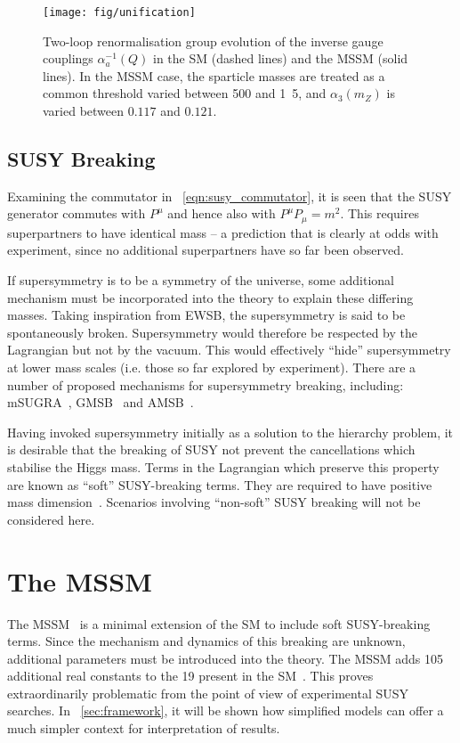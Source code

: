 \begin{figure}[h]
\centering
\texttt{[image: fig/unification]}
\caption[Two-loop renormalisation group evolution of the inverse gauge
couplings]{Two-loop renormalisation group evolution of the inverse gauge
  couplings $\alpha_a^{−1}(Q)$ in the \ac{SM} (dashed lines) and the \ac{MSSM}
  (solid lines). In the MSSM case, the sparticle masses are treated as a common
  threshold varied between \unit{500}{\GeV} and \unit{1.5}{\TeV}, and
  $\alpha_3(m_Z)$ is varied between $0.117$ and $0.121$.~\cite{susy_primer}}
\label{fig:susy_gauge_unification}
\end{figure}

\subsection{\acl{SUSY} Breaking}
Examining the commutator in \eqn~\ref{eqn:susy_commutator}, it is seen that the
\ac{SUSY} generator \Qa commutes with $P^{\mu}$ and hence also with
$P^{\mu}P_{\mu} = m^2$. This requires superpartners to have identical mass -- a
prediction that is clearly at odds with experiment, since no additional
superpartners have so far been observed.

If supersymmetry is to be a symmetry of the universe, some additional mechanism
must be incorporated into the theory to explain these differing masses. Taking
inspiration from \ac{EWSB}, the supersymmetry is said to be spontaneously
broken. Supersymmetry would therefore be respected by the Lagrangian but not by
the vacuum. This would effectively ``hide'' supersymmetry at lower mass scales
(i.e. those so far explored by experiment). There are a number of proposed
mechanisms for supersymmetry breaking, including: \ac{mSUGRA}~\cite{msugra},
\ac{GMSB}~\cite{gmsb} and \ac{AMSB}~\cite{amsb}.

Having invoked supersymmetry initially as a solution to the hierarchy problem,
it is desirable that the breaking of \ac{SUSY} not prevent the cancellations
which stabilise the Higgs mass. Terms in the Lagrangian which preserve this
property are known as ``soft'' \ac{SUSY}-breaking terms. They are required to
have positive mass dimension~\cite{susy_primer}. Scenarios involving
``non-soft'' \ac{SUSY} breaking will not be considered here.

\section{The \acl{MSSM}}
\label{sec:susy_mssm}
The \acf{MSSM}~\cite{mssm} is a minimal extension of the \ac{SM} to include soft
\ac{SUSY}-breaking terms. Since the mechanism and dynamics of this breaking are
unknown, additional parameters must be introduced into the theory. The \ac{MSSM}
adds 105 additional real constants to the 19 present in the
\ac{SM}~\cite[p.~186]{sparticles}. This proves extraordinarily problematic from
the point of view of experimental \ac{SUSY} searches. In
\chap~\ref{sec:framework}, it will be shown how simplified models can offer a
much simpler context for interpretation of results.

